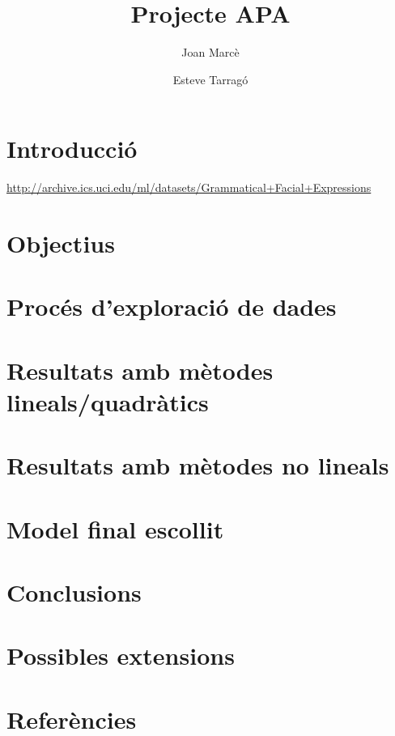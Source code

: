 \documentclass[a4paper]{article}
\title{Projecte APA}
\author{Joan Marcè \and Esteve Tarragó}
\begin{document}
\maketitle
\tableofcontents

\section{Introducció}
\url{http://archive.ics.uci.edu/ml/datasets/Grammatical+Facial+Expressions}
\section{Objectius}
\section{Procés d'exploració de dades}
\section{Resultats amb mètodes lineals/quadràtics}
\section{Resultats amb mètodes no lineals}
\section{Model final escollit}
\section{Conclusions}
\section{Possibles extensions}
\section{Referències}
\end{document}
